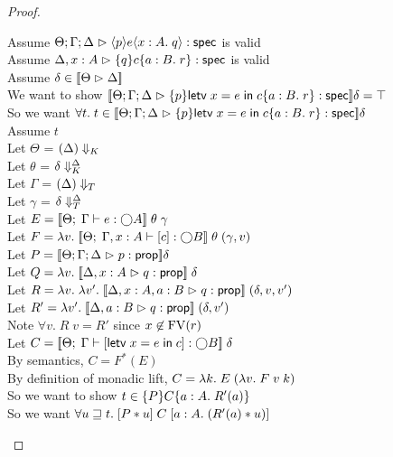 \begin{proof}
  \begin{tabbedproof}
    \oo Assume $\judgeS{\mspec{p}{e}{x:A}{q}}$ is valid \\
    \oo Assume $\judgeS[\Delta,x:A]{\spec{q}{c}{a:B}{r}}$ is valid\\
    \ooo Assume $\delta \in \interp{\judgeACtx{\Delta}}$ \\
    \oooo We want to show $\interp{\judgeS{\spec{p}{\letv{x}{e}{c}}{a:B}{r}}}\delta = \top$\\
    \oooo So we want $\forall t.\; t \in \interp{\judgeS{\spec{p}{\letv{x}{e}{c}}{a:B}{r}}}\delta$ \\
    \oooo Assume $t$ \\
    \ooooo Let $\Theta$ = $\restrictkind{\Delta}$ \\
    \ooooo Let $\theta$ = $\restricttyenv{\Delta}{\delta}$ \\
    \ooooo Let $\Gamma$ = $\restricttype{\Delta}$ \\
    \ooooo Let $\gamma$ = $\restrictvals{\Delta}{\delta}$ \\
    \ooooo Let $E = \interp{\judgeE{\Gamma}{e}{\monad{A}}}\;\theta\;\gamma$ \\
    \ooooo Let $F = \semfun{v}{\interp{\judgeE{\Gamma,x:A}{\comp{c}}{\monad{B}}}\;\theta\;(\gamma,v)}$ \\
    \ooooo Let $P = \interp{\judgeA{p}{\assert}}\delta$ \\
    \ooooo Let $Q = \semfun{v}{\interp{\judgeA[\Delta,x:A]{q}{\assert}}\;\delta}$ \\
    \ooooo Let $R = \semfun{v}{\semfun{v'}{\interp{\judgeA[\Delta,x:A,a:B]{q}{\assert}}\;(\delta, v, v')}}$ \\
    \ooooo Let $R' = \semfun{v'}{\interp{\judgeA[\Delta,a:B]{q}{\assert}}\;(\delta, v')}$ \\
    \ooooo Note $\forall v.\; R\;v = R'$ since $x \not\in \FV{r}$ \\
    \ooooo Let $C = \interp{\judgeE{\Gamma}{\comp{\letv{x}{e}{c}}}{\monad{B}}}\;\delta$ \\
    \ooooo By semantics, $C = F^*(E)$ \\
    \ooooo By definition of monadic lift, $C = \semfun{k}{E\;(\semfun{v}{F\;v\;k})}$ \\
    \ooooo So we want to show $t \in \spec{P}{C}{a:A}{R'(a)}$ \\
    \ooooo So we want $\forall u \sqsupseteq t.\; \basicspec{P * u}{C}{a:A}{(R'(a) * u)}$ \\

\end{tabbedproof}
\end{proof}
